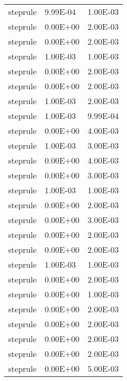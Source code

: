 \begin{appendices}
\begin{center}
\begin{longtable}{|l|l|l|}
steprule                      & 9.99E-04      & 1.00E-03        \\
steprule                      & 0.00E+00      & 2.00E-03        \\
steprule                      & 0.00E+00      & 2.00E-03        \\
steprule                      & 1.00E-03      & 1.00E-03        \\
steprule                      & 0.00E+00      & 2.00E-03        \\
steprule                      & 0.00E+00      & 2.00E-03        \\
steprule                      & 1.00E-03      & 2.00E-03        \\
steprule                      & 1.00E-03      & 9.99E-04        \\
steprule                      & 0.00E+00      & 4.00E-03        \\
steprule                      & 1.00E-03      & 3.00E-03        \\
steprule                      & 0.00E+00      & 4.00E-03        \\
steprule                      & 0.00E+00      & 3.00E-03        \\
steprule                      & 1.00E-03      & 1.00E-03        \\
steprule                      & 0.00E+00      & 2.00E-03        \\
steprule                      & 0.00E+00      & 3.00E-03        \\
steprule                      & 0.00E+00      & 2.00E-03        \\
steprule                      & 0.00E+00      & 2.00E-03        \\
steprule                      & 1.00E-03      & 1.00E-03        \\
steprule                      & 0.00E+00      & 2.00E-03        \\
steprule                      & 0.00E+00      & 1.00E-03        \\
steprule                      & 0.00E+00      & 2.00E-03        \\
steprule                      & 0.00E+00      & 2.00E-03        \\
steprule                      & 0.00E+00      & 2.00E-03        \\
steprule                      & 0.00E+00      & 2.00E-03        \\
steprule                      & 0.00E+00      & 5.00E-03        \\

\end{longtable}
\end{center}
\end{appendices}
